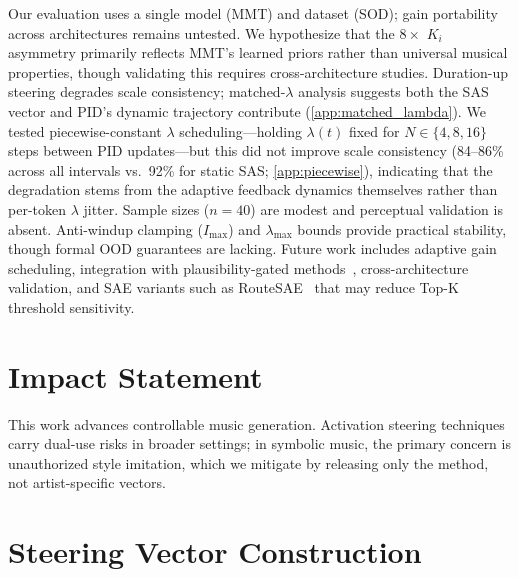 \documentclass{article}
\theoremstyle{plain}
\begin{document}
Our evaluation uses a single model (MMT) and dataset (SOD); gain portability across architectures remains untested. We hypothesize that the $8{\times}$ $K_i$ asymmetry primarily reflects MMT's learned priors rather than universal musical properties, though validating this requires cross-architecture studies. Duration-up steering degrades scale consistency; matched-$\lambda$ analysis suggests both the SAS vector and PID's dynamic trajectory contribute (\cref{app:matched_lambda}). We tested piecewise-constant $\lambda$ scheduling---holding $\lambda(t)$ fixed for $N \in \{4, 8, 16\}$ steps between PID updates---but this did not improve scale consistency (84--86\% across all intervals vs.\ 92\% for static SAS; \cref{app:piecewise}), indicating that the degradation stems from the adaptive feedback dynamics themselves rather than per-token $\lambda$ jitter. Sample sizes ($n{=}40$) are modest and perceptual validation is absent. Anti-windup clamping ($I_\text{max}$) and $\lambda_\text{max}$ bounds provide practical stability, though formal OOD guarantees are lacking. Future work includes adaptive gain scheduling, integration with plausibility-gated methods~\cite{kang2026directer}, cross-architecture validation, and SAE variants such as RouteSAE~\cite{shi2025routesae} that may reduce Top-K threshold sensitivity.

\section*{Impact Statement}
This work advances controllable music generation. Activation steering techniques carry dual-use risks in broader settings; in symbolic music, the primary concern is unauthorized style imitation, which we mitigate by releasing only the method, not artist-specific vectors.




\newpage
\appendix

\section{Steering Vector Construction}
\label{app:vector_construction}
\end{document}
